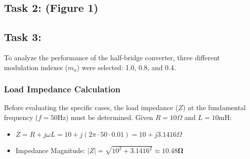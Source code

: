 \documentclass{article}
\begin{document}
\subsection{Task 2: (Figure 1)}
\subsection{Task 3:}
To analyze the performance of the half-bridge converter, three different modulation indexes ($m_a$) were selected: 1.0, 0.8, and 0.4.
\subsubsection{Load Impedance Calculation}
Before evaluating the specific cases, the load impedance ($Z$) at the fundamental frequency ($f = 50\text{Hz}$) must be determined.
Given $R = 10\Omega$ and $L = 10\text{mH}$:
\begin{itemize}
    \item $Z = R + j\omega L = 10 + j(2\pi \cdot 50 \cdot 0.01) = 10 + j3.1416\Omega$
\end{itemize}
\begin{itemize}
    \item Impedance Magnitude: $|Z| = \sqrt{10^2 + 3.1416^2} \approx \mathbf{10.48\Omega}$
\end{itemize}
\end{document}
